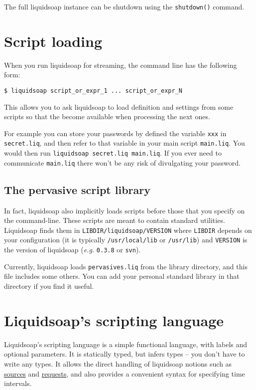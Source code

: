 The full liquidsoap instance
can be shutdown using the \verb+shutdown()+ command.

\section{Script loading}
When you run liquidsoap for streaming, the command line has the following form:

\begin{verbatim}
$ liquidsoap script_or_expr_1 ... script_or_expr_N
\end{verbatim}
This allows you to ask liquidsoap to load definition and settings from
some scripts so that the become available when processing the next ones.

For example you can store your passwords by defined the variable \verb+xxx+
in \verb+secret.liq+, and then refer to that variable in your main script 
\verb+main.liq+. You would then run \verb+liquidsoap secret.liq main.liq+. If you ever 
need to communicate \verb+main.liq+ there won't be any risk of divulgating your 
password.

\subsection{The pervasive script library}
In fact, liquidsoap also implicitly loads scripts before those that you specify 
on the command-line. These scripts are meant to contain standard utilities.
Liquidsoap finds them in \verb+LIBDIR/liquidsoap/VERSION+ where \verb+LIBDIR+ depends on 
your configuration (it is typically \verb+/usr/local/lib+ or \verb+/usr/lib+) and 
\verb+VERSION+ is the version of liquidsoap (\emph{e.g.} \verb+0.3.8+ or \verb+svn+).

Currently, liquidsoap loads \verb+pervasives.liq+ from the library directory,
and this file includes some others.
You can add your personal standard library in that directory
if you find it useful.



\section{Liquidsoap's scripting language}
Liquidsoap's scripting language is a simple functional language,
with labels and optional parameters.
It is statically typed, but infers types -- you don't have to write any types.
It allows the direct handling of liquidsoap notions such
as \href{sources.html}{sources} and \href{requests.html}{requests},
and also provides a convenient syntax for specifying time intervals.

